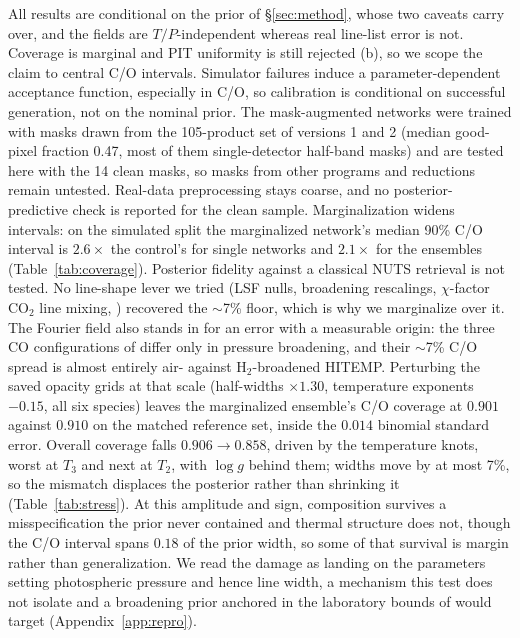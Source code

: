 \documentclass{article}
\begin{document}
All results are conditional on the prior of \S\ref{sec:method}, whose two
caveats carry over, and the fields are $T/P$-independent whereas real line-list
error is not. Coverage is marginal and PIT uniformity is still rejected (b), so
we scope the claim to central C/O intervals. Simulator failures induce a parameter-dependent acceptance function,
especially in C/O, so calibration is conditional on successful generation, not
on the nominal prior.
The mask-augmented networks were trained with masks drawn from the 105-product
set of versions 1 and 2 (median good-pixel fraction 0.47, most of them
single-detector half-band masks) and are tested here with the 14 clean masks, so
masks from other programs and reductions remain untested. Real-data
preprocessing stays coarse, and no posterior-predictive check is reported for
the clean sample. Marginalization widens intervals: on the simulated split the
marginalized network's median 90\% C/O interval is $2.6\times$ the control's
for single networks and $2.1\times$ for the ensembles
(Table~\ref{tab:coverage}). Posterior fidelity against a classical NUTS
retrieval is not tested. No line-shape lever we tried (LSF nulls, broadening rescalings, $\chi$-factor
CO$_2$ line mixing, \citealt{perrin1989}) recovered the $\sim$7\% floor, which
is why we marginalize over it.
The Fourier field also stands in for an error with a measurable origin: the
three CO configurations of \citet{yama2026} differ only in pressure broadening,
and their $\sim$7\% C/O spread is almost entirely air- against H$_2$-broadened
HITEMP. Perturbing the saved opacity
grids at that scale (half-widths $\times1.30$, temperature exponents $-0.15$,
all six species) leaves the marginalized
ensemble's C/O coverage at $0.901$ against $0.910$ on the matched reference set,
inside the $0.014$ binomial standard error. Overall coverage falls
$0.906\to0.858$, driven by the temperature knots, worst at $T_3$ and next at
$T_2$, with $\log g$ behind them; widths move by at most 7\%, so the mismatch
displaces the posterior rather than shrinking it (Table~\ref{tab:stress}). At this amplitude and sign, composition survives a misspecification the prior
never contained and thermal structure does not, though the C/O interval spans
$0.18$ of the prior width, so some of that survival is margin rather than generalization. We read the
damage as landing on the parameters setting photospheric pressure and hence
line width, a mechanism this test does not isolate and a broadening prior anchored in the
laboratory bounds of \citet{hosokawa2025} would target
(Appendix~\ref{app:repro}).
\end{document}
